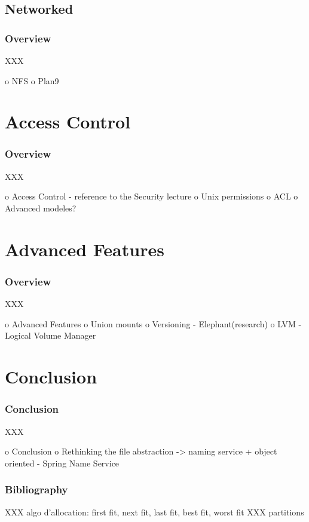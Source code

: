 
\subsection{Networked}


\begin{frame}
  \frametitle{Overview}

  XXX
\end{frame}

 o NFS
 o Plan9

%
%

\section{Access Control}


\begin{frame}
  \frametitle{Overview}

  XXX
\end{frame}

o Access Control
 - reference to the Security lecture
 o Unix permissions
 o ACL
 o Advanced modeles?

%
%

\section{Advanced Features}


\begin{frame}
  \frametitle{Overview}

  XXX
\end{frame}

o Advanced Features
 o Union mounts
 o Versioning
   - Elephant(research)
 o LVM - Logical Volume Manager

%
%

\section{Conclusion}


\begin{frame}
  \frametitle{Conclusion}

  XXX
\end{frame}

o Conclusion
 o Rethinking the file abstraction -> naming service + object oriented
   - Spring Name Service

%
%

\begin{frame}
  \frametitle{Bibliography}

  
  
\end{frame}



XXX algo d'allocation: first fit, next fit, last fit, best fit, worst fit
XXX partitions
